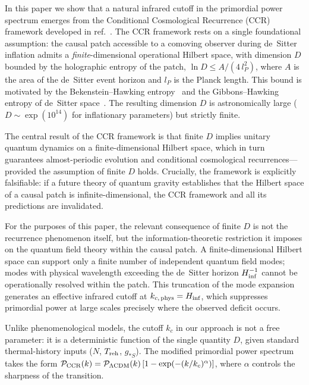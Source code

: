 \documentclass[a4paper,11pt]{article}
\begin{document}
In this paper we show that a natural infrared cutoff in the primordial power
spectrum emerges from the Conditional Cosmological Recurrence (CCR)
framework developed in ref.~\cite{Chronis:2026}. The CCR framework rests on
a single foundational assumption: the causal patch accessible to a comoving
observer during de~Sitter inflation admits a \emph{finite}-dimensional
operational Hilbert space, with dimension $D$ bounded by the holographic
entropy of the patch, $\ln D \leq A/(4\,l_P^2)$,
where $A$ is the area of the de~Sitter event horizon and $l_P$ is the Planck
length. This bound is motivated by the Bekenstein--Hawking
entropy~\cite{Bekenstein:1973,Hawking:1975} and the Gibbons--Hawking entropy
of de~Sitter space~\cite{Gibbons:1977}. The resulting dimension $D$ is
astronomically large ($D \sim \exp(10^{14})$ for inflationary parameters) but
strictly finite.

The central result of the CCR framework is that finite $D$ implies unitary
quantum dynamics on a finite-dimensional Hilbert space, which in turn
guarantees almost-periodic evolution and conditional cosmological
recurrences---provided the assumption of finite $D$ holds. Crucially, the
framework is explicitly falsifiable: if a future theory of quantum gravity
establishes that the Hilbert space of a causal patch is infinite-dimensional,
the CCR framework and all its predictions are invalidated.

For the purposes of this paper, the relevant consequence of finite $D$ is
not the recurrence phenomenon itself, but the information-theoretic
restriction it imposes on the quantum field theory within the causal patch.
A finite-dimensional Hilbert space can support only a finite number of
independent quantum field modes; modes with physical wavelength exceeding
the de~Sitter horizon $H_{\rm inf}^{-1}$ cannot be operationally resolved
within the patch. This truncation of the mode expansion generates an
effective infrared cutoff at $k_{c,\,\rm phys} = H_{\rm inf}$, which
suppresses primordial power at large scales precisely where the observed
deficit occurs.

Unlike phenomenological models, the cutoff $k_c$ in our approach is not a
free parameter: it is a deterministic function of the single quantity $D$,
given standard thermal-history inputs ($N$, $T_{\rm reh}$, $g_{*S}$). The
modified primordial power spectrum takes the form
$\mathcal{P}_{\rm CCR}(k) = \mathcal{P}_{\Lambda\rm CDM}(k)
\left[1 - \exp(-(k/k_c)^\alpha)\right]$, where $\alpha$ controls the
sharpness of the transition.
\end{document}
